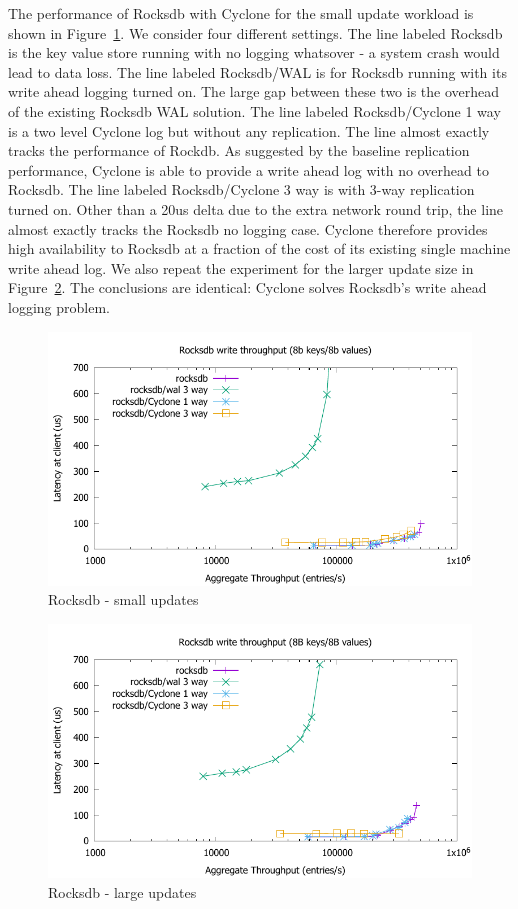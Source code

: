 \documentclass[10pt, preprint, nonatbib]{sigplanconf}
\begin{document}
The performance of Rocksdb with Cyclone for the small update workload is shown
in Figure~\ref{fig:rocksdb}. We consider four different settings. The line
labeled Rocksdb is the key value store running with no logging whatsover - a
system crash would lead to data loss. The line labeled Rocksdb/WAL is for
Rocksdb running with its write ahead logging turned on. The large gap between
these two is the overhead of the existing Rocksdb WAL solution. The line labeled
Rocksdb/Cyclone 1 way is a two level Cyclone log but without any
replication. The line almost exactly tracks the performance of Rockdb. As
suggested by the baseline replication performance, Cyclone is able to provide a
write ahead log with no overhead to Rocksdb. The line labeled Rocksdb/Cyclone 3
way is with 3-way replication turned on. Other than a 20us delta due to the
extra network round trip, the line almost exactly tracks the Rocksdb no logging
case. Cyclone therefore provides high availability to Rocksdb at a fraction of
the cost of its existing single machine write ahead log. We also repeat the
experiment for the larger update size in Figure~\ref{fig:rocksdb_256}. The
conclusions are identical: Cyclone solves Rocksdb's write ahead logging
problem.

\begin{figure}
\includegraphics[scale=0.6]{results2/rocksdb.pdf}
\caption{Rocksdb - small updates}
\label{fig:rocksdb}
\end{figure}

\begin{figure}
\includegraphics[scale=0.6]{results2/rocksdb_256.pdf}
\caption{Rocksdb - large updates}
\label{fig:rocksdb_256}
\end{figure}
\end{document}
